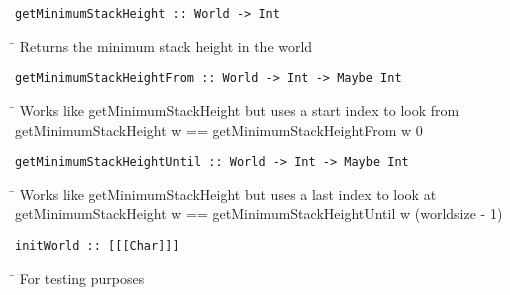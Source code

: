 \begin{verbatim}
getMinimumStackHeight :: World -> Int
\end{verbatim}
\begin{tabbing}
\hspace*{1cm}\= \kill
\> Returns the minimum stack height in the world
\end{tabbing}
\begin{verbatim}
getMinimumStackHeightFrom :: World -> Int -> Maybe Int
\end{verbatim}
\begin{tabbing}
\hspace*{1cm}\= \kill
\> Works like getMinimumStackHeight but uses a start index to look from\\
\> getMinimumStackHeight w == getMinimumStackHeightFrom w 0
\end{tabbing}
\begin{verbatim}
getMinimumStackHeightUntil :: World -> Int -> Maybe Int
\end{verbatim}
\begin{tabbing}
\hspace*{1cm}\= \kill
\> Works like getMinimumStackHeight but uses a last index to look at \\ \> getMinimumStackHeight w == getMinimumStackHeightUntil w (worldsize - 1)
\end{tabbing}
\begin{verbatim}
initWorld :: [[[Char]]]
\end{verbatim}
\begin{tabbing}
\hspace*{1cm}\= \kill
\> For testing purposes
\end{tabbing}
